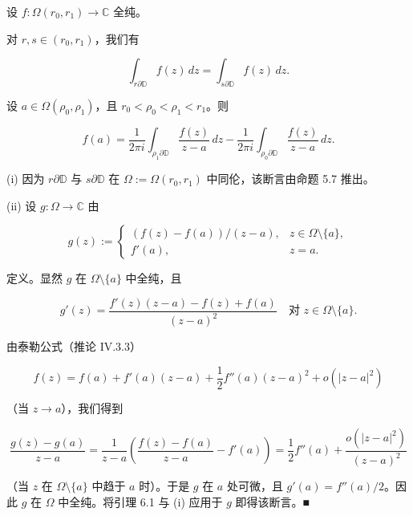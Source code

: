 \begin{lemma}

设 $ f : \Omega(r_{0},r_{1}) \to \mathbb{C} $ 全纯。

\begin{subitems}
\item

对 $ r,s \in (r_{0},r_{1}) $，我们有

\[
\int_{r\partial\mathbb{D}} f(z)\,dz = \int_{s\partial\mathbb{D}} f(z)\,dz .
\]
\item

设 $ a \in \Omega(\rho_{0},\rho_{1}) $，且 $ r_{0} < \rho_{0} < \rho_{1} < r_{1} $。则

\[
f(a) = \frac{1}{2\pi i}\int_{\rho_{1}\partial\mathbb{D}}\frac{f(z)}{z - a}\,dz - \frac{1}{2\pi i}\int_{\rho_{0}\partial\mathbb{D}}\frac{f(z)}{z - a}\,dz .
\]

\proofhead
(i) 因为 $ r\partial\mathbb{D} $ 与 $ s\partial\mathbb{D} $ 在 $ \Omega := \Omega(r_{0},r_{1}) $ 中同伦，该断言由命题 5.7 推出。
\end{subitems}

(ii) 设 $ g : \Omega \to \mathbb{C} $ 由

\begin{equation*}
g(z) := \begin{cases} \left(f(z) - f(a)\right)/(z - a) , & z \in \Omega\setminus\{a\} , \\ f'(a) , & z = a . \end{cases}
\end{equation*}

定义。显然 $ g $ 在 $ \Omega\setminus\{a\} $ 中全纯，且

\begin{equation}
g'(z) = \frac{f'(z)(z - a) - f(z) + f(a)}{(z - a)^{2}} \quad\text{对 } z \in \Omega\setminus\{a\} .\tag{6.2}
\end{equation}

由泰勒公式（推论 IV.3.3）

\begin{equation}
f(z) = f(a) + f'(a)(z - a) + \frac{1}{2}f''(a)(z - a)^{2} + o(|z - a|^{2})\tag{6.3}
\end{equation}

（当 $ z \to a $），我们得到

\[
\frac{g(z) - g(a)}{z - a} = \frac{1}{z - a}\left(\frac{f(z) - f(a)}{z - a} - f'(a)\right) = \frac{1}{2}f''(a) + \frac{o(|z - a|^{2})}{(z - a)^{2}}
\]

（当 $ z $ 在 $ \Omega\setminus\{a\} $ 中趋于 $ a $ 时）。于是 $ g $ 在 $ a $ 处可微，且 $ g'(a) = f''(a)/2 $。因此 $ g $ 在 $ \Omega $ 中全纯。将引理 6.1 与 (i) 应用于 $ g $ 即得该断言。\nobreak\hspace{0.35em}■

\end{lemma}

